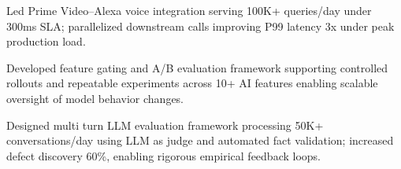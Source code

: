 \documentclass[letterpaper,11pt]{article}
\newcommand{\resumeItem}[1]{
  \item\small{
    {#1 \vspace{0pt}}
  }
}
\begin{document}
      
      \resumeItem{Led Prime Video–Alexa voice integration serving 100K+ queries/day under 300ms SLA; parallelized downstream calls improving P99 latency 3x under peak production load.}
      \resumeItem{Developed feature gating and A/B evaluation framework supporting controlled rollouts and repeatable experiments across 10+ AI features enabling scalable oversight of model behavior changes.}
       \resumeItem{Designed multi turn LLM evaluation framework processing 50K+ conversations/day using LLM as judge and automated fact validation; increased defect discovery 60\%, enabling rigorous empirical feedback loops.}


       

      
      
      
      
      
       
\end{document}
